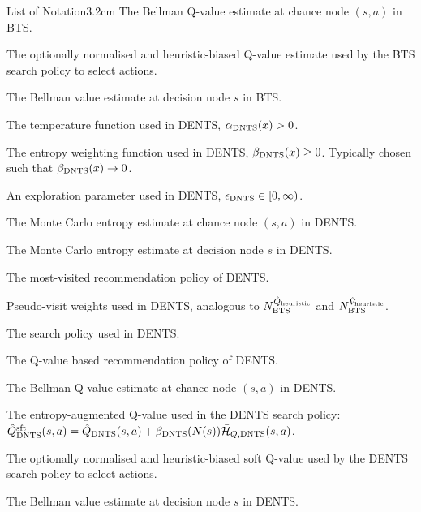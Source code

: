 \begin{mclistof}{List of Notation}{3.2cm}
        The Bellman Q-value estimate at chance node $(s,a)$ in BTS.
    \item[$\Qbtsnorm(s,a)$]
        The optionally normalised and heuristic-biased Q-value estimate used by the BTS search policy to select actions.
    \item[$\Vbts(s)$]
        The Bellman value estimate at decision node $s$ in BTS. %
    \\
    \item[$\alphadents$]
        The temperature function used in DENTS, ${\alpha_{{\textnormal{DNTS}}}}(x)>0$.
    \item[$\betadents$]
        The entropy weighting function used in DENTS, ${\beta_{{\textnormal{DNTS}}}}(x)\geq 0$. Typically chosen such that ${\beta_{{\textnormal{DNTS}}}}(x)\rightarrow 0$.
    \item[$\epsdents$]
        An exploration parameter used in DENTS, ${\epsilon_{{\textnormal{DNTS}}}}\in[0,\infty)$.
    \item[$\HQdents(s,a)$]
        The Monte Carlo entropy estimate at chance node $(s,a)$ in DENTS.
    \item[$\HVdents(s)$]
        The Monte Carlo entropy estimate at decision node $s$ in DENTS.
    \item[$\mvdents$]
        The most-visited recommendation policy of DENTS.
    \item[$\Nqdents, \Nvdents$]
        \hspace{0.25cm} Pseudo-visit weights used in DENTS, analogous to $N^{{\hat{Q}_{\textnormal{heuristic}}}}_{{\textnormal{BTS}}}$ and $N^{{\hat{V}_{\textnormal{heuristic}}}}_{{\textnormal{BTS}}}$.
    \item[$\pidents$]
        The search policy used in DENTS.
    \item[$\psidents$]
        The Q-value based recommendation policy of DENTS.
    \item[$\Qdents(s,a)$]
        The Bellman Q-value estimate at chance node $(s,a)$ in DENTS.
    \item[$\Qdentssoft(s,a)$]
        The entropy-augmented Q-value used in the DENTS search policy: ${\hat{Q}^{{\textnormal{sft}}}_{{\textnormal{DNTS}}}}(s,a)={\hat{Q}_{{\textnormal{DNTS}}}}(s,a)+{\beta_{{\textnormal{DNTS}}}}(N(s)){\bar{\mathcal{H}}_{Q,{\textnormal{DNTS}}}}(s,a)$.
    \item[$\Qdentsnorm(s,a)$]
        The optionally normalised and heuristic-biased soft Q-value used by the DENTS search policy to select actions.
    \item[$\Vdents(s)$]
        The Bellman value estimate at decision node $s$ in DENTS. %
    \\

\end{mclistof}

